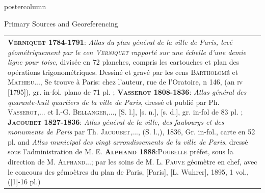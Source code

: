 \documentclass[final,hyperref={pdfpagelabels=false}]{beamer}
\begin{document}
\begin{frame}
\begin{columns}
\begin{column}{0.5\textwidth}
\begin{beamercolorbox}[center,wd=\textwidth]{postercolumn}
\begin{minipage}[t]{.98\textwidth}
\begin{block}{Primary Sources and Georeferencing}
\begin{tabular}{p{}p{}}
          \multicolumn{2}{p{0.9\textwidth}}{
            \tiny{
              \textsc{\textbf{Verniquet 1784-1791}:}
                \textit{Atlas du plan général de la ville de Paris, levé géométriquement par le cen \textsc{Verniquet} rapporté sur une échelle d'une demie ligne pour toise}, divisée en 72 planches, compris les cartouches et plan des opérations trigonométriques.
                Dessiné et gravé par les cens \textsc{Bartholomé} et \textsc{Mathieu}...,
                Se trouve à Paris: chez l'auteur, rue de l'Oratoire, n 146, (an \textsc{iv} [1795]), gr. in-fol. plano de 71 pl. ;
              \textsc{\textbf{Vasserot 1808-1836}:}
                \textit{Atlas général des quarante-huit quartiers de la ville de Paris}, dressé et publié par Ph. \textsc{Vasserot},... et I.-G. \textsc{Bellanger},..., [S. l.], [s. n.], [s. d.], gr. in-fol de 83 pl. ;
              \textsc{\textbf{Jacoubet 1827-1836}:}
                \textit{Atlas général de la ville, des faubourgs et des monuments de Paris} par Th. \textsc{Jacoubet},..., (S. l.,), 1836, Gr. in-fol., carte en 52 pl. and \textit{Atlas municipal des vingt arrondissements de la ville de Paris}, dressé sous l'administration de M. E.
              \textsc{\textbf{Alphand 1888}:}\textsc{Poubelle} préfet, sous la direction de M. \textsc{Alphand}...; par les soins de M. L. \textsc{Fauve} géomètre en chef, avec le concours des gémoètres du plan de Paris, [Paris], [L. Wuhrer], 1895, 1 vol., ([1]-16 pl.)
            }
          }\\
	  

\end{tabular}
\end{block}
\end{minipage}
\end{beamercolorbox}
\end{column}
\end{columns}
\end{frame}
\end{document}
